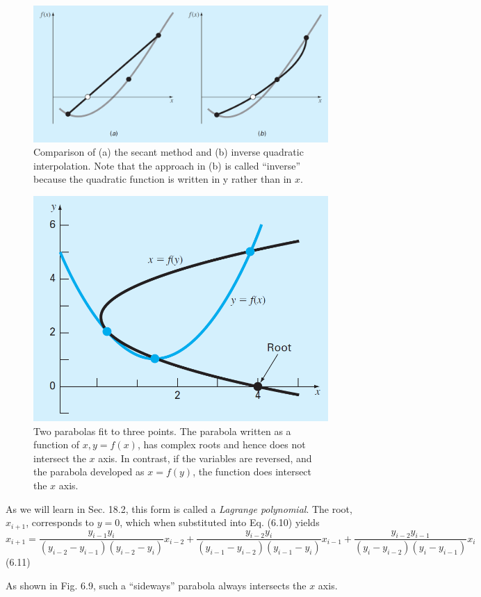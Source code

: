 \documentclass[../main.tex]{subfiles}
\begin{document}
\begin{figure}[h]
    \includegraphics[width=0.8\linewidth]{./images/fig_6_8}
    \caption{Comparison of (a) the secant method and (b) inverse quadratic interpolation. Note that the
    approach in (b) is called ``inverse'' because the quadratic function is written in y rather than in $x$.}
\end{figure}

\begin{figure}[h]
    \includegraphics[width=0.5\linewidth]{./images/fig_6_9}
    \caption{Two parabolas fit to three points. The parabola written as a function of $x, y = f(x)$, has complex
    roots and hence does not intersect the $x$ axis. In contrast, if the variables are reversed, and the
    parabola developed as $x = f (y)$, the function does intersect the $x$ axis.}
\end{figure}
\bigskip

\noindent As we will learn in Sec. 18.2, this form is called a \emph{Lagrange polynomial}. The root, $x_{i+1}$, corresponds
to $y = 0$, which when substituted into Eq. (6.10) yields\\

$x_{i+1}= \dfrac{y_{i-1}y_i}{(y_{i-2} - y_{i-1})(y_{i-2} - y_i)}x_{i-2}+
\dfrac{y_{i-2}y_i}{(y_{i-1} - y_{i-2})(y_{i-1} - y_i)}x_{i-1}+
\dfrac{y_{i-2}y_{i-1}}{(y_{i} - y_{i-2})(y_{i} - y_{i-1})}x_{i}$
\hfill (6.11)\\
\bigskip

\noindent As shown in Fig. 6.9, such a ``sideways'' parabola always intersects the $x$ axis.\\
\end{document}
